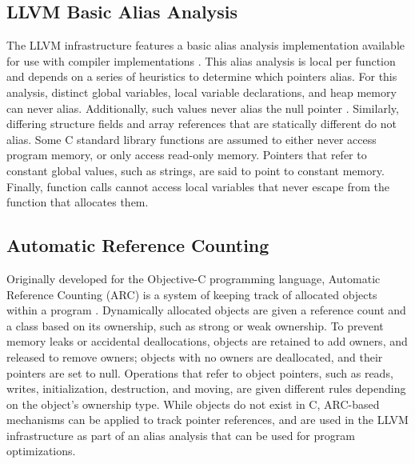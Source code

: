 \subsection{LLVM Basic Alias Analysis}
The LLVM infrastructure features a basic alias analysis implementation available for use with compiler implementations \cite{llvmaa}. This alias analysis is local per function and depends on a series of heuristics to determine which pointers alias. For this analysis, distinct global variables, local variable declarations, and heap memory can never alias. Additionally, such values never alias the null pointer \cite{llvmaa}. Similarly, differing structure fields and array references that are statically different do not alias. Some C standard library functions are assumed to either never access program memory, or only access read-only memory. Pointers that refer to constant global values, such as strings, are said to point to constant memory. Finally, function calls cannot access local variables that never escape from the function that allocates them.

\subsection{Automatic Reference Counting}
Originally developed for the Objective-C programming language, Automatic Reference Counting (ARC) is a system of keeping track of allocated objects within a program \cite{ARC}. Dynamically allocated objects are given a reference count and a class based on its ownership, such as strong or weak ownership. To prevent memory leaks or accidental deallocations, objects are retained to add owners, and released to remove owners; objects with no owners are deallocated, and their pointers are set to null. Operations that refer to object pointers, such as reads, writes, initialization, destruction, and moving, are given different rules depending on the object's ownership type. While objects do not exist in C, ARC-based mechanisms can be applied to track pointer references, and are used in the LLVM infrastructure as part of an alias analysis that can be used for program optimizations.

